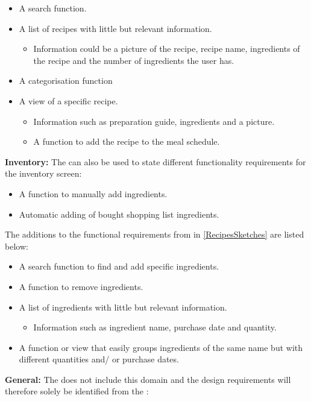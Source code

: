 \begin{itemize}
	\item A search function.
	\item A list of recipes with little but relevant information.
		\begin{itemize}
			\item Information could be a picture of the recipe, recipe name, ingredients of the recipe and the number of ingredients the user has.
		\end{itemize}
	\item A categorisation function
	\item A view of a specific recipe.
		\begin{itemize}
			\item Information such as preparation guide, ingredients and a picture.
			\item A function to add the recipe to the meal schedule.
		\end{itemize}
\end{itemize}

\textbf{Inventory:}
The  can also be used to state different functionality requirements for the inventory screen:

\begin{itemize}
	\item A function to manually add ingredients.
	\item Automatic adding of bought shopping list ingredients.
\end{itemize}

The additions to the functional requirements from  in \cref{RecipesSketches} are listed below:

\begin{itemize}
	\item A search function to find and add specific ingredients.
	\item A function to remove ingredients.
	\item A list of ingredients with little but relevant information.
		\begin{itemize}
			\item Information such as ingredient name, purchase date and quantity.
		\end{itemize}
	\item A function or view that easily groups ingredients of the same name but with different quantities and/ or purchase dates.
\end{itemize}  

\textbf{General:}   
The  does not include this domain and the design requirements will therefore solely be identified from the :

